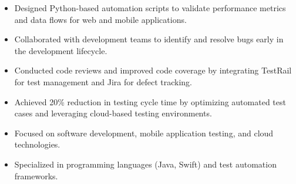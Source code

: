 \par\smallskip
\noindent
\begin{minipage}{20cm}
  \begin{minipage}{9.75cm}
    \begin{itemize}
      \item Designed Python-based automation scripts to validate performance metrics and data flows for web and mobile applications.
      \item Collaborated with development teams to identify and resolve bugs early in the development lifecycle.
    \end{itemize}
  \end{minipage}
  \hfill
  \begin{minipage}{9.75cm}
    \begin{itemize}
      \item Conducted code reviews and improved code coverage by integrating TestRail for test management and Jira for defect tracking.
      \item Achieved 20\% reduction in testing cycle time by optimizing automated test cases and leveraging cloud-based testing environments.
    \end{itemize}
  \end{minipage}
\end{minipage}
\par\smallskip
\divider

\begin{itemize}
  \item Focused on software development, mobile application testing, and cloud technologies.
\end{itemize}
\divider

\begin{itemize}
  \item Specialized in programming languages (Java, Swift) and test automation frameworks.
\end{itemize}

\noindent
\begin{minipage}{20cm}
\end{minipage}


